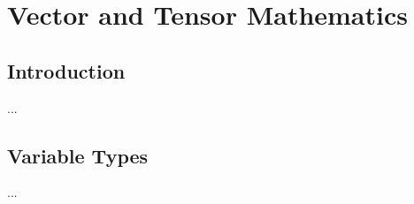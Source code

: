 %
%
%

\chapter{Vector and Tensor Mathematics}

\label{chap:MathAnnex}

\section{Introduction}

...

\section{Variable Types}

...

